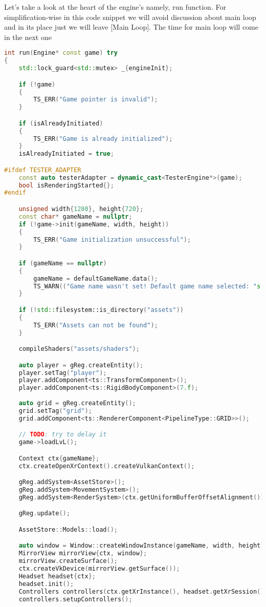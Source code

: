 Let's take a look at the heart of the engine's namely, run function.
For simplification-wise in this code snippet we will avoid discussion about main loop and in its place just we will leave [Main Loop].
The time for main loop will come in the next one
\begin{lstlisting}[language=c++, caption=Engine's run function (./engine/src/core/core.cpp)]
int run(Engine* const game) try
{
    std::lock_guard<std::mutex> _{engineInit};

    if (!game)
    {
        TS_ERR("Game pointer is invalid");
    }

    if (isAlreadyInitiated)
    {
        TS_ERR("Game is already initialized");
    }
    isAlreadyInitiated = true;

#ifdef TESTER_ADAPTER
    const auto testerAdapter = dynamic_cast<TesterEngine*>(game);
    bool isRenderingStarted{};
#endif

    unsigned width{1280}, height{720};
    const char* gameName = nullptr;
    if (!game->init(gameName, width, height))
    {
        TS_ERR("Game initialization unsuccessful");
    }

    if (gameName == nullptr)
    {
        gameName = defaultGameName.data();
        TS_WARN(("Game name wasn't set! Default game name selected: "s + gameName).c_str());
    }

    if (!std::filesystem::is_directory("assets"))
    {
        TS_ERR("Assets can not be found");
    }

    compileShaders("assets/shaders");

    auto player = gReg.createEntity();
    player.setTag("player");
    player.addComponent<ts::TransformComponent>();
    player.addComponent<ts::RigidBodyComponent>(7.f);
    
    auto grid = gReg.createEntity();
    grid.setTag("grid");
    grid.addComponent<ts::RendererComponent<PipelineType::GRID>>();

    // TODO: try to delay it
    game->loadLvL();

    Context ctx{gameName};
    ctx.createOpenXrContext().createVulkanContext();

    gReg.addSystem<AssetStore>();
    gReg.addSystem<MovementSystem>();
    gReg.addSystem<RenderSystem>(ctx.getUniformBufferOffsetAlignment());

    gReg.update();

    AssetStore::Models::load();

    auto window = Window::createWindowInstance(gameName, width, height);
    MirrorView mirrorView{ctx, window};
    mirrorView.createSurface();
    ctx.createVkDevice(mirrorView.getSurface());
    Headset headset{ctx};
    headset.init();
    Controllers controllers(ctx.getXrInstance(), headset.getXrSession());
    controllers.setupControllers();


\end{lstlisting}
